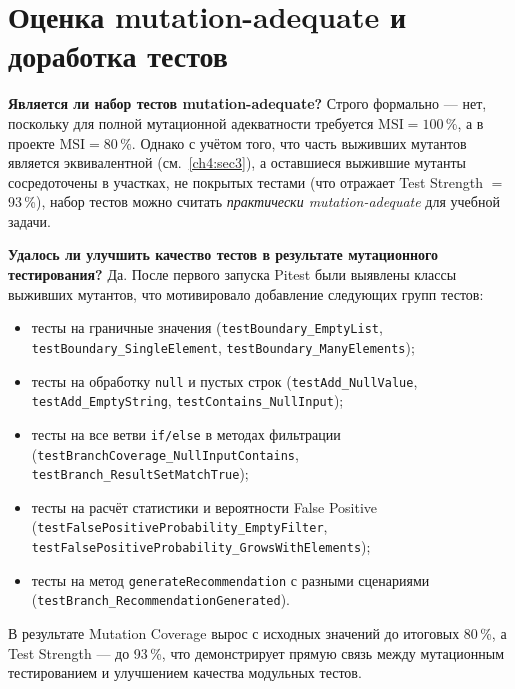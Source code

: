 \section{Оценка mutation-adequate и доработка тестов} \label{ch4:sec5}

\textbf{Является ли набор тестов mutation-adequate?} Строго формально --- нет, поскольку для полной мутационной адекватности требуется $\text{MSI} = 100\,\%$, а в проекте $\text{MSI} = 80\,\%$. Однако с учётом того, что часть выживших мутантов является эквивалентной (см.~\ref{ch4:sec3}), а оставшиеся выжившие мутанты сосредоточены в участках, не покрытых тестами (что отражает Test Strength $=$ 93\,\%), набор тестов можно считать \emph{практически mutation-adequate} для учебной задачи.

\textbf{Удалось ли улучшить качество тестов в результате мутационного тестирования?} Да. После первого запуска Pitest были выявлены классы выживших мутантов, что мотивировало добавление следующих групп тестов:
\begin{itemize}
    \item тесты на граничные значения (\texttt{testBoundary\_EmptyList}, \texttt{testBoundary\_Single\-Element}, \texttt{testBoundary\_Many\-Elements});
    \item тесты на обработку \texttt{null} и пустых строк (\texttt{testAdd\_Null\-Value}, \texttt{testAdd\_Empty\-String}, \texttt{testContains\_Null\-Input});
    \item тесты на все ветви \texttt{if/else} в методах фильтрации (\texttt{testBranch\-Coverage\_Null\-Input\-Contains}, \texttt{testBranch\_Result\-Set\-Match\-True});
    \item тесты на расчёт статистики и вероятности False Positive (\texttt{testFalse\-Positive\-Probability\_Empty\-Filter}, \texttt{testFalse\-Positive\-Probability\_Grows\-With\-Elements});
    \item тесты на метод \texttt{generateRecommendation} с разными сценариями (\texttt{testBranch\_Recom\-mendation\-Generated}).
\end{itemize}

В результате Mutation Coverage вырос с исходных значений до итоговых 80\,\%, а Test Strength --- до 93\,\%, что демонстрирует прямую связь между мутационным тестированием и улучшением качества модульных тестов.

%
